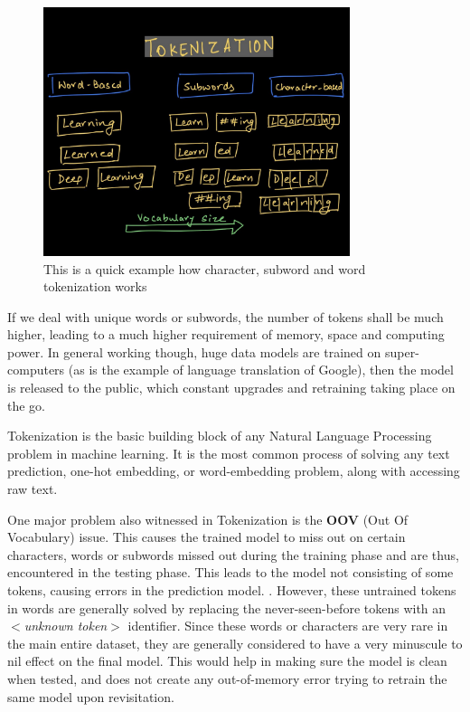 \begin{figure}[H]
	\begin{center}
		\includegraphics[width = 0.8\textwidth]{Images/tokenization.jpeg} %
		\caption{This is a quick example how character, subword and word tokenization works}
		\label{fig:tokenization-types}
	\end{center}
\end{figure}


If we deal with unique words or subwords, the number of tokens shall be much higher, leading to a much higher requirement of memory, space and computing power. In general working though, huge data models are trained on super-computers (as is the example of language translation of Google), then the model is released to the public, which constant upgrades and retraining taking place on the go.

Tokenization is the basic building block of any Natural Language Processing problem in machine learning. It is the most common process of solving any text prediction, one-hot embedding, or word-embedding problem, along with accessing raw text. 

One major problem also witnessed in Tokenization is the \textbf{OOV} (Out Of Vocabulary) issue. This causes the trained model to miss out on certain characters, words or subwords missed out during the training phase and are thus, encountered in the testing phase. This leads to the model not consisting of some tokens, causing errors in the prediction model. \textcite{tokenization_nlp_analyticsvidhya} .
However, these untrained tokens in words are generally solved by replacing the never-seen-before tokens with an \textit{$<$unknown token$>$} identifier. Since these words or characters are very rare in the main entire dataset, they are generally considered to have a very minuscule to nil effect on the final model. This would help in making sure the model is clean when tested, and does not create any out-of-memory error trying to retrain the same model upon revisitation.
 
